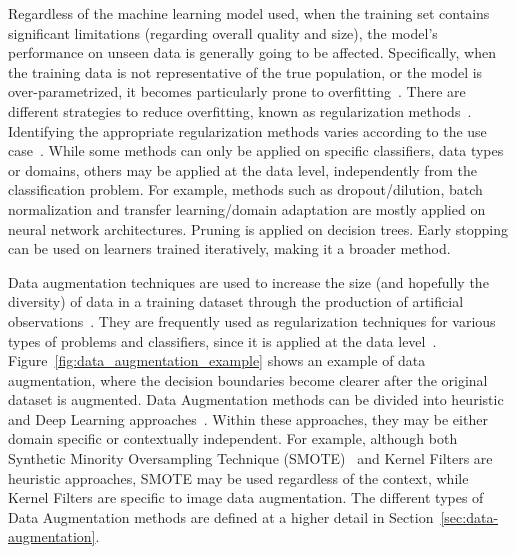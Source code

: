 \documentclass[parskip=full]{scrartcl}
\begin{document}
Regardless of the machine learning model used, when the training set contains
significant limitations (regarding overall quality and size), the model's
performance on unseen data is generally going to be affected. Specifically,
when the training data is not representative of the true population, or the
model is over-parametrized, it becomes particularly prone to
overfitting~\cite{Bartlett2021}. There are different strategies to reduce
overfitting, known as regularization methods~\cite{Shorten2019}. Identifying
the appropriate regularization methods varies according to the use
case~\cite{Chun2020}. While some methods can only be applied on specific
classifiers, data types or domains, others may be applied at the data level,
independently from the classification problem. For example, methods such as
dropout/dilution, batch normalization and transfer learning/domain adaptation
are mostly applied on neural network architectures.  Pruning is applied on
decision trees. Early stopping can be used on learners trained iteratively,
making it a broader method. 

Data augmentation techniques are used to increase the size (and hopefully the
diversity) of data in a training dataset through the production of artificial
observations~\cite{Van2001, Wong2016}. They are frequently used as
regularization techniques for various types of problems and classifiers, since
it is applied at the data level~\cite{Behpour2019}.
Figure~\ref{fig:data_augmentation_example} shows an example of data
augmentation, where the decision boundaries become clearer after the original
dataset is augmented. Data Augmentation methods can be divided into heuristic
and Deep Learning approaches~\cite{Shorten2019, Ratner2017}. Within these
approaches, they may be either domain specific or contextually independent.
For example, although both Synthetic Minority Oversampling Technique
(SMOTE)~\cite{Chawla2002} and Kernel Filters are heuristic approaches, SMOTE
may be used regardless of the context, while Kernel Filters are specific to
image data augmentation. The different types of Data Augmentation methods are
defined at a higher detail in Section~\ref{sec:data-augmentation}.
\end{document}
